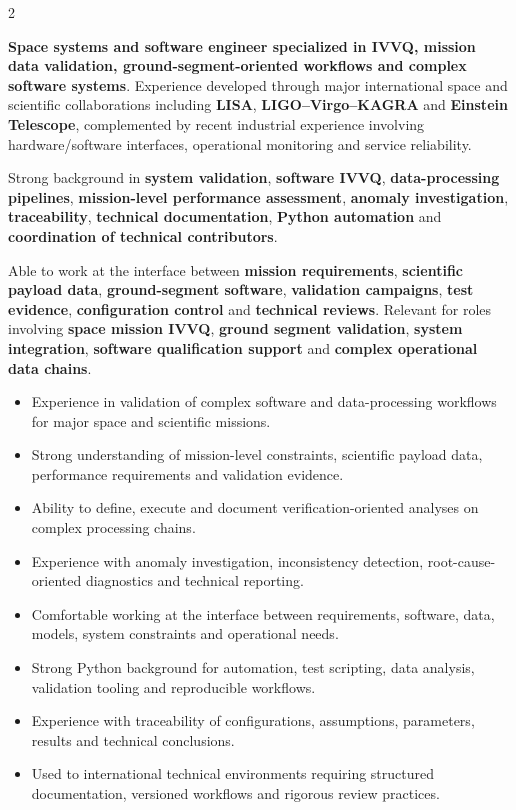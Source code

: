 \documentclass[8pt,a4paper,ragged2e,withhyper]{altacv}
\begin{document}
\begin{paracol}{2}
\switchcolumn


\textbf{Space systems and software engineer specialized in IVVQ, mission data validation, ground-segment-oriented workflows and complex software systems}. Experience developed through major international space and scientific collaborations including \textbf{LISA}, \textbf{LIGO--Virgo--KAGRA} and \textbf{Einstein Telescope}, complemented by recent industrial experience involving hardware/software interfaces, operational monitoring and service reliability.

Strong background in \textbf{system validation}, \textbf{software IVVQ}, \textbf{data-processing pipelines}, \textbf{mission-level performance assessment}, \textbf{anomaly investigation}, \textbf{traceability}, \textbf{technical documentation}, \textbf{Python automation} and \textbf{coordination of technical contributors}.

Able to work at the interface between \textbf{mission requirements}, \textbf{scientific payload data}, \textbf{ground-segment software}, \textbf{validation campaigns}, \textbf{test evidence}, \textbf{configuration control} and \textbf{technical reviews}. Relevant for roles involving \textbf{space mission IVVQ}, \textbf{ground segment validation}, \textbf{system integration}, \textbf{software qualification support} and \textbf{complex operational data chains}.


\begin{itemize}
  \item Experience in validation of complex software and data-processing workflows for major space and scientific missions.
  \item Strong understanding of mission-level constraints, scientific payload data, performance requirements and validation evidence.
  \item Ability to define, execute and document verification-oriented analyses on complex processing chains.
  \item Experience with anomaly investigation, inconsistency detection, root-cause-oriented diagnostics and technical reporting.
  \item Comfortable working at the interface between requirements, software, data, models, system constraints and operational needs.
  \item Strong Python background for automation, test scripting, data analysis, validation tooling and reproducible workflows.
  \item Experience with traceability of configurations, assumptions, parameters, results and technical conclusions.
  \item Used to international technical environments requiring structured documentation, versioned workflows and rigorous review practices.
\end{itemize}


\end{paracol}
\end{document}
